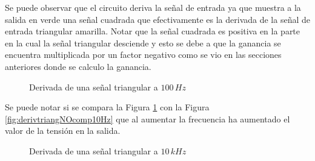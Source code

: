 \documentclass[11pt, a4paper]{article}
\begin{document}
Se puede observar que el circuito deriva la señal de entrada ya que muestra a la salida en verde una señal cuadrada que efectivamente es la derivada de la señal de entrada triangular amarilla. Notar que la señal cuadrada es positiva en la parte en la cual la señal triangular desciende y esto se debe a que la ganancia se encuentra multiplicada por un factor negativo como se vio en las secciones anteriores donde se calculo la ganancia.

\begin{figure}[H]
	\begin{center}
		\caption{Derivada de una señal triangular a $100 \, Hz$}
		\label{fig:derivtriangNOcomp100Hz}
	\end{center}
\end{figure}

Se puede notar si se compara la Figura \ref{fig:derivtriangNOcomp100Hz} con la Figura \ref{fig:derivtriangNOcomp10Hz} que al aumentar la frecuencia ha aumentado el valor de la tensión en la salida.

\begin{figure}[H]
	\begin{center}
		\caption{Derivada de una señal triangular a $10 \, kHz$}
		\label{fig:derivtriangNOcomp10kHz}
	\end{center}
\end{figure}
\end{document}
